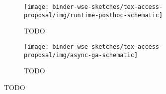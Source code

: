 \begin{figure*}
  \centering
  \begin{subfigure}[b]{0.43\linewidth}
    \centering
  \texttt{[image: binder-wse-sketches/tex-access-proposal/img/runtime-posthoc-schematic]}
    \caption{TODO}
    \label{fig:runtime-posthoc-schematic}
  \end{subfigure}
  \begin{subfigure}[b]{0.43\linewidth}
    \centering
  \texttt{[image: binder-wse-sketches/tex-access-proposal/img/async-ga-schematic]}
    \caption{TODO}
    \label{fig:async-ga-schematic}
  \end{subfigure}

\caption{TODO}
\label{fig:schematic}

\end{figure*}
